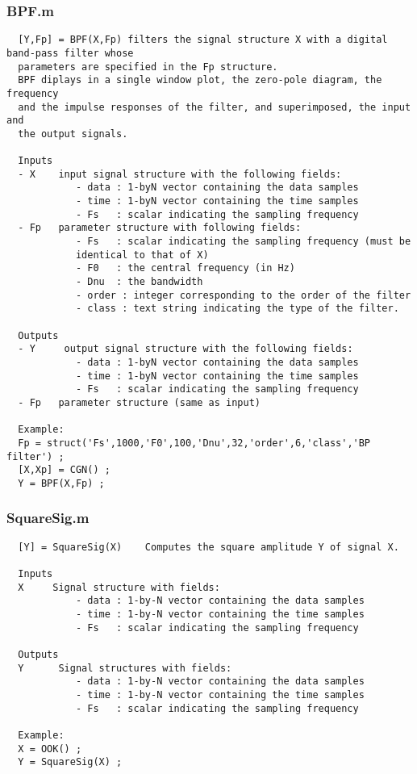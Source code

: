 \documentclass{article}
\begin{document}
\subsubsection{BPF.m}


        \color{lightgray} \begin{verbatim}  [Y,Fp] = BPF(X,Fp) filters the signal structure X with a digital band-pass filter whose 
  parameters are specified in the Fp structure.
  BPF diplays in a single window plot, the zero-pole diagram, the frequency 
  and the impulse responses of the filter, and superimposed, the input and
  the output signals.
 
  Inputs
  - X    input signal structure with the following fields:
            - data : 1-byN vector containing the data samples
            - time : 1-byN vector containing the time samples
            - Fs   : scalar indicating the sampling frequency
  - Fp   parameter structure with following fields:
            - Fs   : scalar indicating the sampling frequency (must be
            identical to that of X)
            - F0   : the central frequency (in Hz)
            - Dnu  : the bandwidth 
            - order : integer corresponding to the order of the filter 
            - class : text string indicating the type of the filter.
 
  Outputs
  - Y     output signal structure with the following fields:
            - data : 1-byN vector containing the data samples
            - time : 1-byN vector containing the time samples
            - Fs   : scalar indicating the sampling frequency
  - Fp   parameter structure (same as input)
 
  Example:
  Fp = struct('Fs',1000,'F0',100,'Dnu',32,'order',6,'class','BP filter') ;  
  [X,Xp] = CGN() ;
  Y = BPF(X,Fp) ;
\end{verbatim} \color{black}



\subsubsection{SquareSig.m}

        \color{black} \begin{verbatim}  [Y] = SquareSig(X)    Computes the square amplitude Y of signal X.
 
  Inputs
  X     Signal structure with fields:
            - data : 1-by-N vector containing the data samples
            - time : 1-by-N vector containing the time samples
            - Fs   : scalar indicating the sampling frequency
 
  Outputs
  Y      Signal structures with fields:
            - data : 1-by-N vector containing the data samples
            - time : 1-by-N vector containing the time samples
            - Fs   : scalar indicating the sampling frequency
 
  Example:
  X = OOK() ;
  Y = SquareSig(X) ;
\end{verbatim} \color{black}
    
\end{document}

